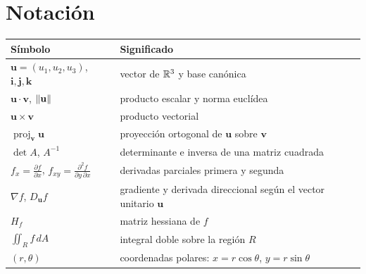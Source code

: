 \documentclass[11pt,a4paper,twoside,openany]{book}
\newcommand{\vu}{\mathbf{u}}
\newcommand{\vv}{\mathbf{v}}
\newcommand{\vi}{\mathbf{i}}
\newcommand{\vj}{\mathbf{j}}
\newcommand{\vk}{\mathbf{k}}
\newcommand{\proj}{\operatorname{proj}}
\newcommand{\dA}{\,dA}
\newcommand{\pd}[2]{\frac{\partial #1}{\partial #2}}
\begin{document}
\section*{Notación}
\begin{center}
\begin{tabular}{@{}ll@{}}
\toprule
Símbolo & Significado \\
\midrule
$\vu=(u_1,u_2,u_3)$, $\vi,\vj,\vk$ & vector de $\mathbb{R}^3$ y base canónica \\
$\vu\cdot\vv$, $\norm{\vu}$ & producto escalar y norma euclídea \\
$\vu\times\vv$ & producto vectorial \\
$\proj_{\vv}\vu$ & proyección ortogonal de $\vu$ sobre $\vv$ \\
$\det A$, $A^{-1}$ & determinante e inversa de una matriz cuadrada \\
$f_x=\pd fx$, $f_{xy}=\frac{\partial^2 f}{\partial y\,\partial x}$ & derivadas parciales primera y segunda \\
$\nabla f$, $D_{\vu}f$ & gradiente y derivada direccional según el vector unitario $\vu$ \\
$H_f$ & matriz hessiana de $f$ \\
$\iint_R f\dA$ & integral doble sobre la región $R$ \\
$(r,\theta)$ & coordenadas polares: $x=r\cos\theta$, $y=r\sin\theta$ \\
\bottomrule
\end{tabular}
\end{center}

\tableofcontents

\mainmatter







\appendix


\backmatter

\end{document}

